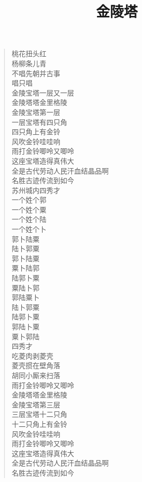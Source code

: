\documentclass[UTF8]{ctexart}
\title{金陵塔}
\begin{document}
\maketitle

\begin{verse}
桃花扭头红 \\
杨柳条儿青 \\
不唱先朝并古事 \\
唱只唱 \\
金陵宝塔一层又一层 \\

金陵塔塔金里格陵 \\
金陵宝塔第一层 \\
一层宝塔有四只角 \\
四只角上有金铃 \\
风吹金铃哇哇响 \\
雨打金铃唧呤又唧呤 \\
这座宝塔造得真伟大 \\
全是古代劳动人民汗血结晶品啊 \\
名胜古迹传流到如今 \\

苏州城内四秀才 \\
一个姓个郭 \\
一个姓个粟 \\
一个姓个陆  \\
一个姓个卜 \\
郭卜陆粟 \\
陆卜郭粟 \\
郭卜陆粟 \\
粟卜陆郭 \\
陆郭卜粟 \\
粟陆卜郭 \\
郭陆粟卜 \\
陆卜郭粟 \\
陆郭卜粟 \\
郭陆卜粟 \\
粟卜郭陆 \\
四秀才 \\
吃菱肉剥菱壳 \\
菱壳掼在壁角落 \\
胡同小厮来扫落 \\
雨打金铃唧呤又唧呤 \\

金陵塔塔金里格陵 \\
金陵宝塔第三层 \\
三层宝塔十二只角 \\
十二只角上有金铃 \\
风吹金铃哇哇响 \\
雨打金铃唧呤又唧呤 \\
这座宝塔造得真伟大 \\
全是古代劳动人民汗血结晶品啊 \\
名胜古迹传流到如今 \\


\end{verse}
\end{document}
